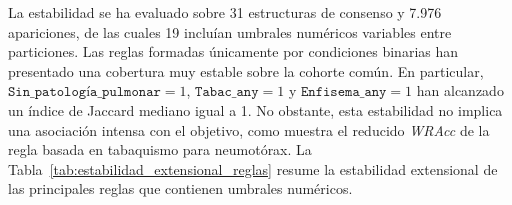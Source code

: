 



La estabilidad se ha evaluado sobre 31 estructuras de consenso y 7.976 apariciones, de las cuales 19 incluían umbrales numéricos variables entre particiones. Las reglas formadas únicamente por condiciones binarias han presentado una cobertura muy estable sobre la cohorte común. En particular, \(\texttt{Sin\_patología\_pulmonar}=1\), \(\texttt{Tabac\_any}=1\) y \(\texttt{Enfisema\_any}=1\) han alcanzado un índice de Jaccard mediano igual a 1. No obstante, esta estabilidad no implica una asociación intensa con el objetivo, como muestra el reducido \textit{WRAcc} de la regla basada en tabaquismo para neumotórax. La Tabla~\ref{tab:estabilidad_extensional_reglas} resume la estabilidad extensional de las principales reglas que contienen umbrales numéricos.


